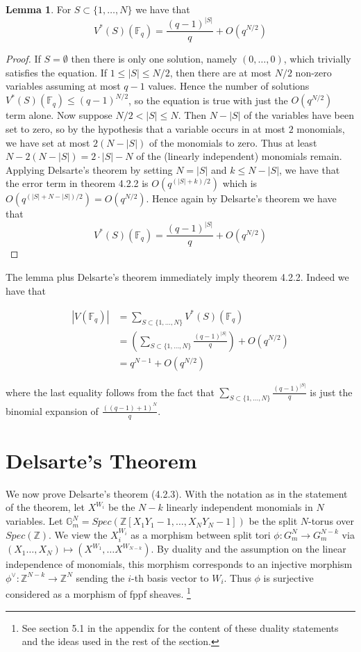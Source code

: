 \documentclass{ucbthesis}
\theoremstyle{definition}
\theoremstyle{theorem}
\newtheorem{lem}[thm]{Lemma}
\begin{document}
\begin{lem}
For $S \subset \{1,\ldots, N\}$ we have that $$V^{*}(S)(\mathbb{F}_{q}) = \frac{(q-1)^{|S|}}{q}
+ O(q^{N/2})$$
\end{lem}

\begin{proof}
If $S=\emptyset$ then there is only one solution, namely $(0,\ldots, 0)$, which trivially satisfies the equation. If $ 1\leq |S| \leq N/2$, then there are at most $N/2$ non-zero variables assuming at most $q-1$ values. Hence the number of solutions $V^{*}(S)(\mathbb{F}_{q}) \leq (q-1)^{N/2}$, so the equation is true with just the $O(q^{N/2})$ term alone. Now suppose $ N/2 < |S| \leq N$. Then $N-|S|$ of the variables have been set to zero, so by the hypothesis that a variable occurs in at most $2$ monomials, we have set at most $2(N-|S|)$ of the monomials to zero. Thus at least $N- 2(N-|S|) = 2\cdot|S|-N$ of the (linearly independent) monomials remain. Applying Delsarte's theorem by setting $N = |S|$ and $k \leq N-|S|$, we have that the error term in theorem 4.2.2 is $O(q^{(|S|+k)/2})$ which is $O(q^{(|S| + N - |S|)/2}) = O(q^{N/2})$. Hence again by Delsarte's theorem we have that $$V^{*}(S)(\mathbb{F}_{q}) = \frac{(q-1)^{|S|}}{q}
+ O(q^{N/2})$$
\end{proof}

The lemma plus Delsarte's theorem immediately imply theorem 4.2.2. Indeed we have that 

\begin{align*}
|V(\mathbb{F}_{q})| &= \sum\limits_{S\subset \{1,\ldots,N\}}V^{*}(S)(\mathbb{F}_{q})\\
&=  (\sum\limits_{S\subset \{1,\ldots,N\}}\frac{(q-1)^{|S|}}{q}) + O(q^{N/2})\\
&= q^{N-1} + O(q^{N/2})
\end{align*}

where the last equality follows from the fact that $\sum\limits_{S\subset \{1,\ldots,N\}}\frac{(q-1)^{|S|}}{q}$ is just the binomial expansion of $\frac{((q-1)+1)^N}{q}$. 

\section{Delsarte's Theorem}

We now prove Delsarte's theorem (4.2.3). With the notation as in the statement of the theorem, let $X^{W_i}$ be
 the $N-k$ linearly independent monomials in $N$ variables. Let $\mathbb{G}_{m}^{N} = Spec(\mathbb{Z}[X_{1}Y_{1}-1,\ldots,X_{N}Y_{N}-1])$ be the split $N$-torus over $Spec(\mathbb{Z})$. We view the $X_{i}^{W_{i}}$ as a morphism between split tori
  $\phi: G_{m}^{N} \rightarrow G_{m}^{N-k}$ via $(X_1\ldots,X_N) \mapsto (X^{W_1},\ldots X^{W_{N-k}})$. By duality and
   the assumption on the linear independence of monomials, this morphism corresponds to an injective
    morphism $\phi^{\vee}:\mathbb{Z}^{N-k} \rightarrow \mathbb{Z}^{N}$ sending the $i$-th basis vector to
     $W_{i}$. Thus $\phi$ is surjective considered as a morphism of fppf sheaves. \footnote{See section 5.1 in the appendix  for the
      content of these duality statements and the ideas used in the rest of the section.}
\end{document}
